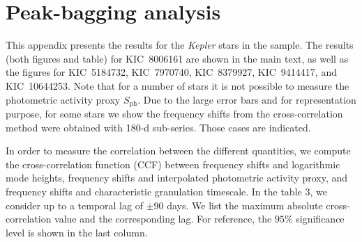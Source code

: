 \documentclass[twocolumn]{aastex61}%
\begin{document}
\section{Peak-bagging analysis}\label{sec:peakapp}

This appendix presents the results for the {\it Kepler} stars in the sample. The results (both figures and table) for KIC~8006161 are shown in the main text, as well as the figures for KIC~5184732, KIC~7970740, KIC~8379927, KIC~9414417, and KIC~10644253. Note that for a number of stars it is not possible to measure the photometric activity proxy $S_\text{ph}$. Due to the large error bars and for representation purpose, for some stars we show the frequency shifts from the cross-correlation method were obtained with 180-d sub-series. Those cases are indicated.

In order to measure the correlation between the different quantities, we compute the cross-correlation function (CCF) between frequency shifts and logarithmic mode heights, frequency shifts and interpolated photometric activity proxy, and frequency shifts and characteristic granulation timescale. In the table 3, we consider up to a temporal lag of $\pm 90$ days. We list the maximum absolute cross-correlation value and the corresponding lag. For reference, the $95\%$ significance level is shown in the last column.%
\end{document}
